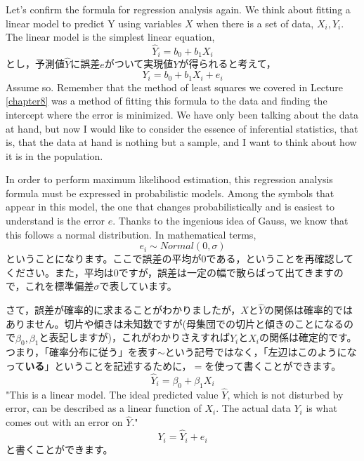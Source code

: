 \documentclass{ltjsarticle}
\begin{document}
Let's confirm the formula for regression analysis again. We think about fitting a linear model to predict Y using variables $X$ when there is a set of data, $X_i, Y_i$. The linear model is the simplest linear equation,
\[\hat{Y}_i = b_0 + b_1 X_i \]
とし，予測値$\hat{Y}$に誤差$e$がついて実現値$Y$が得られると考えて，
\[ Y_i= b_0 + b_1 X_i + e_i  \]
Assume so. Remember that the method of least squares we covered in Lecture \ref{chapter8} was a method of fitting this formula to the data and finding the intercept where the error is minimized. We have only been talking about the data at hand, but now I would like to consider the essence of inferential statistics, that is, that the data at hand is nothing but a sample, and I want to think about how it is in the population.

In order to perform maximum likelihood estimation, this regression analysis formula must be expressed in probabilistic models. Among the symbols that appear in this model, the one that changes probabilistically and is easiest to understand is the error $e$. Thanks to the ingenious idea of Gauss, we know that this follows a normal distribution. In mathematical terms,
\[ e_i \sim Normal(0,\sigma) \]
ということになります。ここで誤差の平均が0である，ということを再確認してください。また，平均は0ですが，誤差は一定の幅で散らばって出てきますので，これを標準偏差$\sigma$で表しています。

さて，誤差が確率的に求まることがわかりましたが，$X$と$\hat{Y}$の関係は確率的ではありません。切片や傾きは未知数ですが(母集団での切片と傾きのことになるので$\beta_0,\beta_1$と表記しますが)，これがわかりさえすれば$\hat{Y}_i$と$X_i$の関係は確定的です。つまり，「確率分布に従う」を表す$\sim$という記号ではなく，「左辺はこのようになって\textbf{いる}」ということを記述するために，$=$を使って書くことができます。
\[ \hat{Y}_i = \beta_0 + \beta_1 X_i \]
"This is a linear model. The ideal predicted value $\hat{Y}$, which is not disturbed by error, can be described as a linear function of $X_i$. The actual data $Y_i$ is what comes out with an error on $\hat{Y}$."
\[ Y_i = \hat{Y}_i + e_i  \]
と書くことができます。
\end{document}

